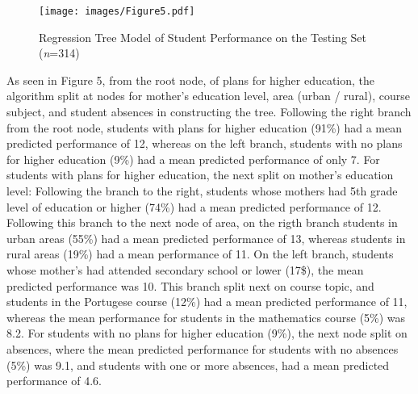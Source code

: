 \documentclass[sigconf]{acmart}
\begin{document}
\begin{figure}[!ht]
  \centering\texttt{[image: images/Figure5.pdf]}
  \caption{Regression Tree Model of Student Performance on the
  Testing Set (\textit{n}=314)}
  \label{f:Figure5}
\end{figure}

As seen in Figure 5, from the root node, of plans for higher education, the 
algorithm split at nodes for mother's education level, area (urban / rural),
course subject, and student absences in constructing the tree. Following 
the right branch from the root node, students with plans for higher education 
(91\%) had a mean predicted performance of 12, whereas on the left branch, 
students with no plans for higher education (9\%) had a mean predicted
performance of only 7. For students with plans for higher education, the next 
split on mother's education level: Following the branch to the right, students 
whose mothers had 5th grade level of education or higher (74\%) had a mean 
predicted performance of 12. Following this branch to the next node of area, 
on the rigth branch students in urban areas (55\%) had a mean predicted
performance of 13, whereas students in rural areas (19\%) had a mean 
performance of 11. On the left branch, students whose mother's had attended 
secondary school or lower (17\$), the mean predicted performance was 10. This 
branch split next on course topic, and students in the Portugese course (12\%) 
had a mean predicted performance of 11, whereas the mean performance for 
students in the mathematics course (5\%) was 8.2. For students with no plans for 
higher education (9\%), the next node split on absences, where the mean 
predicted performance for students with no absences (5\%) was 9.1, and students 
with one or more absences, had a mean predicted performance of 4.6. 

\end{document}

